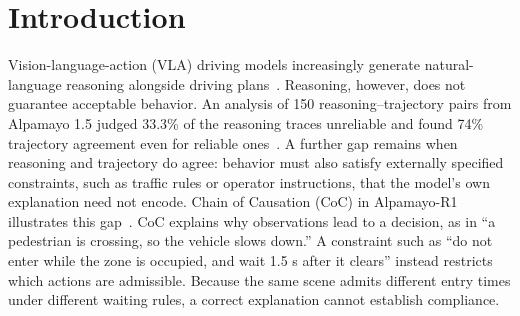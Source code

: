 \section{Introduction}\label{sec:introduction}

Vision-language-action (VLA) driving models increasingly generate natural-language reasoning alongside driving plans~\cite{r1,r2,r3}. Reasoning, however, does not guarantee acceptable behavior. An analysis of 150 reasoning--trajectory pairs from Alpamayo 1.5 judged 33.3\% of the reasoning traces unreliable and found 74\% trajectory agreement even for reliable ones~\cite{r18}. A further gap remains when reasoning and trajectory do agree: behavior must also satisfy externally specified constraints, such as traffic rules or operator instructions, that the model's own explanation need not encode. Chain of Causation (CoC) in Alpamayo-R1 illustrates this gap~\cite{r1}. CoC explains why observations lead to a decision, as in ``a pedestrian is crossing, so the vehicle slows down.'' A constraint such as ``do not enter while the zone is occupied, and wait 1.5 s after it clears'' instead restricts which actions are admissible. Because the same scene admits different entry times under different waiting rules, a correct explanation cannot establish compliance.\par

